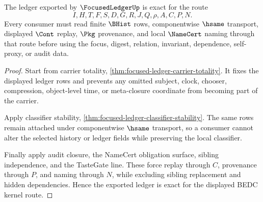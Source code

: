 \begin{theorem}
\label{thm:focused-ledger-ledger-exactness}
The ledger exported by $\FocusedLedgerUp$ is exact for the route
$$
I,H,T,F,S,D,G,R,J,Q,\rho,A,C,P,N .
$$
Every consumer must read finite $\BHist$ rows, componentwise $\hsame$ transport, displayed $\Cont$ replay, $\Pkg$ provenance, and local $\NameCert$ naming through that route before using the focus, digest, relation, invariant, dependence, self-proxy, or audit data.
\end{theorem}
\begin{proof}
Start from carrier totality, \autoref{thm:focused-ledger-carrier-totality}. It fixes the displayed ledger rows and prevents any omitted subject, clock, chooser, compression, object-level time, or meta-closure coordinate from becoming part of the carrier.

Apply classifier stability, \autoref{thm:focused-ledger-classifier-stability}. The same rows remain attached under componentwise $\hsame$ transport, so a consumer cannot alter the selected history or ledger fields while preserving the local classifier.

Finally apply audit closure, the NameCert obligation surface, sibling independence, and the TasteGate line. These force replay through $C$, provenance through $P$, and naming through $N$, while excluding sibling replacement and hidden dependencies. Hence the exported ledger is exact for the displayed BEDC kernel route.
\end{proof}

